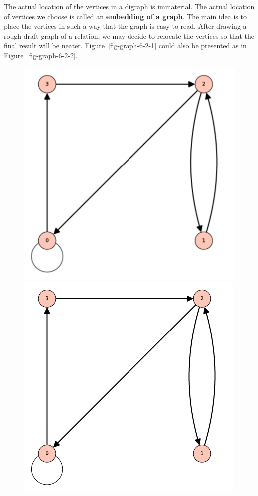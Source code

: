 \documentclass[10pt,]{book}
\newcommand{\terminology}[1]{\textbf{#1}}
\theoremstyle{plain}
\theoremstyle{definition}
\theoremstyle{definition}
\theoremstyle{definition}
\theoremstyle{definition}
\begin{document}
\par
The actual location of the vertices in a digraph is immaterial. The actual location of vertices we choose is called an \terminology{embedding of a graph}. The main idea is to place the vertices in such a way that the graph is easy to read. After drawing a rough-draft graph of a relation, we may decide to relocate the vertices so that the final result will be neater. \hyperref[fig-graph-6-2-1]{Figure~\ref{fig-graph-6-2-1}} could also
be presented as in \hyperref[fig-graph-6-2-2]{Figure~\ref{fig-graph-6-2-2}}.%
\leavevmode%
\begin{figure}
\centering
{}%
{\includegraphics[width=1\linewidth]{images/graph-6-2-2.pdf}}%
{\includegraphics[width=1\linewidth]{images/graph-6-2-2.png}}

\end{figure}
\end{document}
